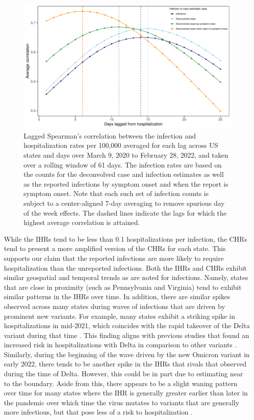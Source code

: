 \documentclass{article}
\begin{document}
\begin{figure}[!tb]
\centering
    \includegraphics[width=.8\textwidth]{adj_unadj_sym_inc_hosp_lag_corr_Nov2.pdf} 
    \caption{Lagged Spearman's correlation between the infection and
    hospitalization rates per 100,000 averaged for each lag across US states
    and days over March 9, 2020 to February 28, 2022, and taken over a rolling
    window of 61 days. The infection rates are based on the counts for the
    deconvolved case and infection estimates as well as the reported infections
    by symptom onset and when the report is symptom onset. Note that each such
    set of infection counts is subject to a center-aligned 7-day averaging to
    remove spurious day of the week effects. The dashed lines indicate the lags
    for which the highest average correlation is attained.}
    \label{fig:adj_unadj_sym_hosp_lag_corr}
\end{figure}
While the IHRs tend to be less than 0.1 hospitalizations per infection, the CHRs tend to 
present a more amplified version of the CHRs for each state.
This supports our claim that the reported infections are more likely to require hospitalization
than the unreported infections. Both the IHRs and CHRs exhibit similar geospatial and 
temporal trends as are noted for infections. 
Namely, states that are close in proximity (such as Pennsylvania and Virginia) tend to exhibit similar patterns in
the IHRs over time. In addition, there are similar spikes observed across many states during 
waves of infections that are driven by prominent new variants. For example, many
states exhibit a striking spike in hospitalizations in mid-2021, which coincides with the rapid takeover 
of the Delta variant during that time \citep{hodcroft2021covariants}. This finding aligns with 
previous studies that found an increased risk in hospitalizations with Delta in comparison to other
variants \citep{twohig2022hospital, nyberg2022comparative}. Similarly, during the beginning of the
wave driven by the new Omicron variant in early 2022, there tends to be another spike in the IHRs
that rivals that observed during the time of Delta. However, this could be in part due to estimating near to the boundary.
Aside from this, there appears to be a slight waning pattern over time for many states where the
IHR is generally greater earlier than later in the pandemic over which time the virus mutates to variants that 
are generally more infectious, but that pose less of a risk to 
hospitalization \citep{lorenzo2022covid, blauer2022compare}.
\end{document}
